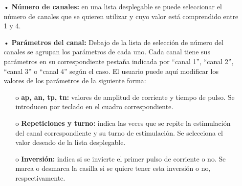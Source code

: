 \begin{itemize}
\item[•] \textbf{Número de canales:} en una lista desplegable se puede seleccionar el número de canales que se quieren utilizar y cuyo valor está comprendido entre 1 y 4.
\item[•] \textbf{Parámetros del canal:} Debajo de la lista de selección de número del canales se agrupan los parámetros de cada uno. Cada canal tiene sus parámetros en su correspondiente pestaña indicada por ``canal 1'', ``canal 2'', ``canal 3'' o ``canal 4'' según el caso. El usuario puede aquí modificar los valores de los parámetros de la siguiente forma:
\begin{itemize}
\item[o] \textbf{ap, an, tp, tn:} valores de amplitud de corriente y tiempo de pulso. Se introducen por teclado en el cuadro correspondiente.  
\item[o] \textbf{Repeticiones y turno:} indica las veces que se repite la estimulación del canal correspondiente y su turno de estimulación. Se selecciona el valor deseado de la lista desplegable.
\item[o] \textbf{Inversión:} indica si se invierte el primer pulso de corriente o no. Se marca o desmarca la casilla si se quiere tener esta inversión o no, respectivamente.
\end{itemize}           
\end{itemize}

